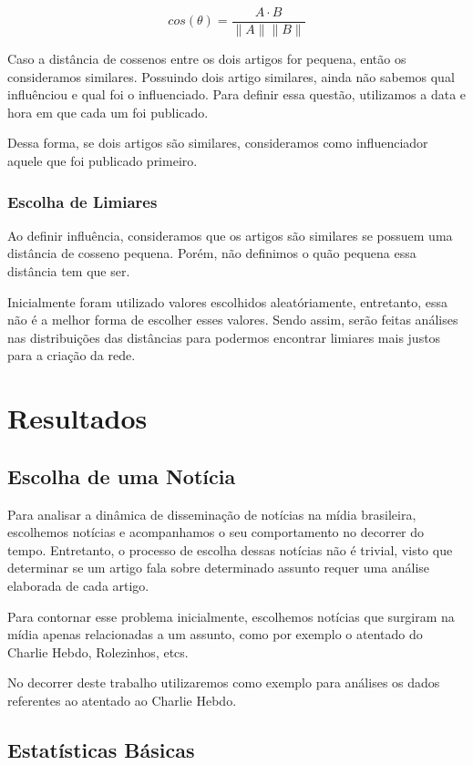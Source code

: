 \documentclass[a4paper,12pt]{article}
\begin{document}
 $$ cos(\theta) = \dfrac{A \cdot B}{\parallel A\parallel \parallel B \parallel} $$
 
 Caso a distância de cossenos entre os dois artigos for pequena, então os consideramos similares. Possuindo dois artigo similares, ainda não
 sabemos qual influênciou e qual foi o influenciado. Para definir essa questão, utilizamos a data e hora em que cada um foi publicado.
 
 Dessa forma, se dois artigos são similares, consideramos como influenciador aquele que foi publicado primeiro. 

 
\subsubsection{Escolha de Limiares}

 Ao definir influência, consideramos que os artigos são similares se possuem uma distância de cosseno pequena. Porém, não definimos
 o quão pequena essa distância tem que ser. 
 
 Inicialmente foram utilizado valores escolhidos aleatóriamente, entretanto, essa não é a melhor forma de escolher esses valores.
 Sendo assim, serão feitas análises nas distribuições das distâncias para podermos encontrar limiares mais justos para a criação da rede.
  
 
\section{Resultados}
 

\subsection{Escolha de uma Notícia}

Para analisar a dinâmica de disseminação de notícias na mídia brasileira, escolhemos notícias e acompanhamos o seu comportamento no decorrer 
do tempo.
Entretanto, o processo de escolha dessas notícias não é trivial, visto que determinar se um artigo fala sobre determinado assunto requer
uma análise elaborada de cada artigo.

Para contornar esse problema inicialmente, escolhemos notícias que surgiram na mídia apenas relacionadas a um assunto, como por exemplo o atentado
do Charlie Hebdo, Rolezinhos, etcs.

No decorrer deste trabalho utilizaremos como exemplo para análises os dados referentes ao atentado ao Charlie Hebdo.
  

  \pagebreak
\subsection{Estatísticas Básicas}
\end{document}
